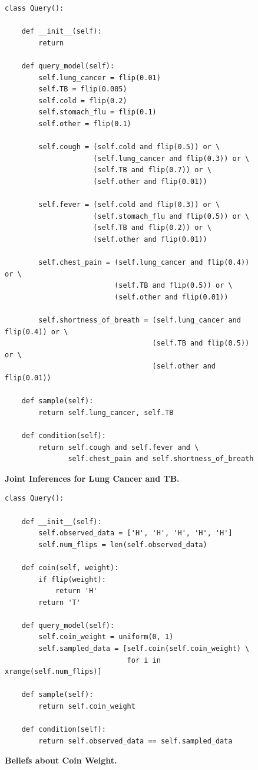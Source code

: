\documentclass[12pt,letterpaper]{article}
\begin{document}
\begin{figure}[h!]
\begin{verbatim}
class Query():

    def __init__(self):
        return

    def query_model(self):
        self.lung_cancer = flip(0.01)
        self.TB = flip(0.005)
        self.cold = flip(0.2)
        self.stomach_flu = flip(0.1)
        self.other = flip(0.1)

        self.cough = (self.cold and flip(0.5)) or \
                     (self.lung_cancer and flip(0.3)) or \
                     (self.TB and flip(0.7)) or \
                     (self.other and flip(0.01))
        
        self.fever = (self.cold and flip(0.3)) or \
                     (self.stomach_flu and flip(0.5)) or \
                     (self.TB and flip(0.2)) or \
                     (self.other and flip(0.01))

        self.chest_pain = (self.lung_cancer and flip(0.4)) or \
                          (self.TB and flip(0.5)) or \
                          (self.other and flip(0.01))

        self.shortness_of_breath = (self.lung_cancer and flip(0.4)) or \
                                   (self.TB and flip(0.5)) or \
                                   (self.other and flip(0.01))

    def sample(self):
        return self.lung_cancer, self.TB

    def condition(self):
        return self.cough and self.fever and \
               self.chest_pain and self.shortness_of_breath
\end{verbatim}
\caption{\small\textbf{Joint Inferences for Lung Cancer and TB.}}
\label{fig:test3model}
\end{figure}

\begin{figure}[h!]
\begin{verbatim}
class Query():

    def __init__(self):
        self.observed_data = ['H', 'H', 'H', 'H', 'H']
        self.num_flips = len(self.observed_data)

    def coin(self, weight):
        if flip(weight):
            return 'H'
        return 'T'

    def query_model(self):
        self.coin_weight = uniform(0, 1)
        self.sampled_data = [self.coin(self.coin_weight) \
                             for i in xrange(self.num_flips)]

    def sample(self):
        return self.coin_weight

    def condition(self):
        return self.observed_data == self.sampled_data
\end{verbatim}
\caption{\small\textbf{Beliefs about Coin Weight.}}
\label{fig:test4model}
\end{figure}
\end{document}
